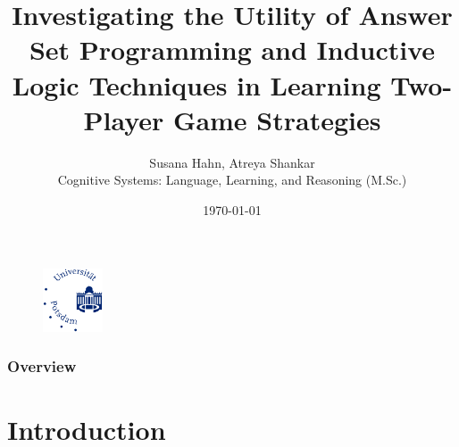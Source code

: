 \documentclass{beamer}
\title{Investigating the Utility of Answer Set Programming and Inductive Logic Techniques in Learning Two-Player Game Strategies}
\author{Susana Hahn, Atreya Shankar \\ Cognitive Systems: Language, Learning, and Reasoning (M.Sc.)}
\institute{PM - Computational Intelligence \\ Knowledge Processing and Information Systems}
\date{\today}
\begin{document}
\begin{frame}
\titlepage %
\vspace{-10px}
\begin{figure}
  \includegraphics[width=50pt]{uni-potsdam.jpg}
  \label{fig:logo}
\end{figure}
\end{frame}




\begin{frame}
\frametitle{Overview}
\setcounter{tocdepth}{1}
\tableofcontents 
\end{frame}


\section{Introduction}
\end{document}
